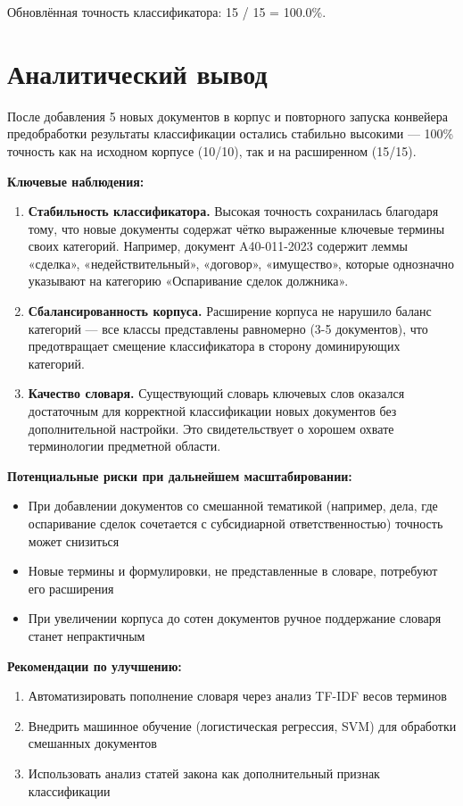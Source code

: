 \documentclass[12pt, a4paper]{report}
\begin{document}
Обновлённая точность классификатора: 15 / 15 = 100.0\%.

\section{Аналитический вывод}

После добавления 5 новых документов в корпус и повторного запуска конвейера предобработки результаты классификации остались стабильно высокими — 100\% точность как на исходном корпусе (10/10), так и на расширенном (15/15).

\textbf{Ключевые наблюдения:}
\begin{enumerate}
  \item \textbf{Стабильность классификатора.} Высокая точность сохранилась благодаря тому, что новые документы содержат чётко выраженные ключевые термины своих категорий. Например, документ A40-011-2023 содержит леммы «сделка», «недействительный», «договор», «имущество», которые однозначно указывают на категорию «Оспаривание сделок должника».
  \item \textbf{Сбалансированность корпуса.} Расширение корпуса не нарушило баланс категорий — все классы представлены равномерно (3-5 документов), что предотвращает смещение классификатора в сторону доминирующих категорий.
  \item \textbf{Качество словаря.} Существующий словарь ключевых слов оказался достаточным для корректной классификации новых документов без дополнительной настройки. Это свидетельствует о хорошем охвате терминологии предметной области.
\end{enumerate}

\textbf{Потенциальные риски при дальнейшем масштабировании:}
\begin{itemize}
  \item При добавлении документов со смешанной тематикой (например, дела, где оспаривание сделок сочетается с субсидиарной ответственностью) точность может снизиться
  \item Новые термины и формулировки, не представленные в словаре, потребуют его расширения
  \item При увеличении корпуса до сотен документов ручное поддержание словаря станет непрактичным
\end{itemize}

\textbf{Рекомендации по улучшению:}
\begin{enumerate}
  \item Автоматизировать пополнение словаря через анализ TF-IDF весов терминов
  \item Внедрить машинное обучение (логистическая регрессия, SVM) для обработки смешанных документов
  \item Использовать анализ статей закона как дополнительный признак классификации
\end{enumerate}
\end{document}
